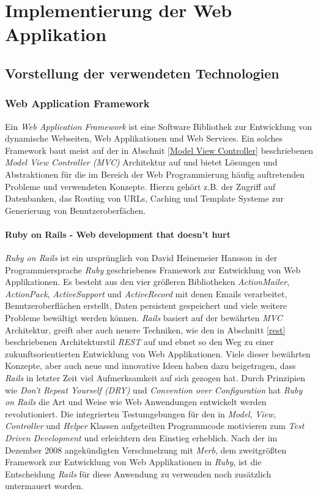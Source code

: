 \chapter{Implementierung der Web Applikation}

\section{Vorstellung der verwendeten Technologien}

\subsection{Web Application Framework}

Ein \textit{Web Application Framework} ist eine Software Bibliothek
zur Entwicklung von dynamische Webseiten, Web Applikationen und Web
Services. Ein solches Framework baut meist auf der in Abschnit
\ref{Model View Controller} beschriebenen \textit{Model View
  Controller (MVC)} Architektur auf und bietet Lösungen und
Abstraktionen für die im Bereich der Web Programmierung häufig
auftretenden Probleme und verwendeten Konzepte. Hierzu gehört z.B. der
Zugriff auf Datenbanken, das Routing von URLs, Caching und Template
Systeme zur Generierung von Benutzeroberfächen.


\subsubsection{Ruby on Rails - Web development that doesn't hurt}

\textit{Ruby on Rails} ist ein ursprünglich von David Heinemeier
Hansson in der Programmiersprache \textit{Ruby} geschriebenes
Framework zur Entwicklung von Web Applikationen. Es besteht aus den
vier größeren Bibliotheken \textit{ActionMailer}, \textit{ActionPack},
\textit{ActiveSupport} und \textit{ActiveRecord} mit denen Emails
verarbeitet, Benutzeroberflächen erstellt, Daten persistent
gespeichert und viele weitere Probleme bewältigt werden
können. \textit{Rails} basiert auf der bewährten \textit{MVC}
Architektur, greift aber auch neuere Techniken, wie den in Abschnitt
\ref{rest} beschriebenen Architekturstil \textit{REST} auf und ebnet
so den Weg zu einer zukunftsorientierten Entwicklung von Web
Applikationen. Viele dieser bewährten Konzepte, aber auch neue und
innovative Ideen haben dazu beigetragen, dass \textit{Rails} in
letzter Zeit viel Aufmerksamkeit auf sich gezogen hat. Durch
Prinzipien wie \textit{Don't Repeat Yourself (DRY)} und
\textit{Convention over Configuration} hat \textit{Ruby on Rails} die
Art und Weise wie Web Anwendungen entwickelt werden
revolutioniert. Die integrierten Testumgebungen für den in
\textit{Model}, \textit{View}, \textit{Controller} und \textit{Helper}
Klassen aufgeteilten Programmcode motivieren zum \textit{Test Driven
  Development} und erleichtern den Einstieg erheblich.  Nach der im
Dezember 2008 angekündigten Verschmelzung mit \textit{Merb}, dem
zweitgrößten Framework zur Entwicklung von Web Applikationen in
\textit{Ruby}, ist die Entscheidung \textit{Rails} für diese Anwendung
zu verwenden noch zusätzlich untermauert worden.


